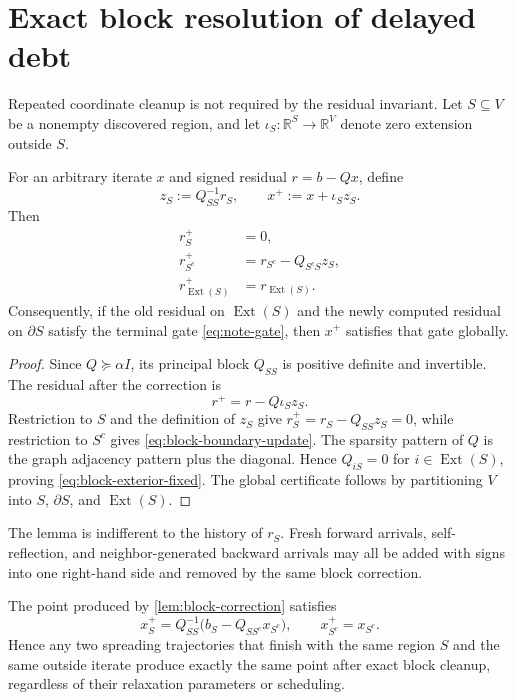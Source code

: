 \section{Exact block resolution of delayed debt}
\label{sec:block-resolution}

Repeated coordinate cleanup is not required by the residual invariant.  Let
$S\subseteq V$ be a nonempty discovered region, and let
$\iota_S:\mathbb R^S\to\mathbb R^V$ denote zero extension outside $S$.

\begin{lemma}
\label{lem:block-correction}
For an arbitrary iterate $x$ and signed residual $r=b-Qx$, define
\begin{equation}
 z_S:=Q_{SS}^{-1}r_S,
 \qquad
 x^+:=x+\iota_S z_S.
 \label{eq:block-correction}
\end{equation}
Then
\begin{align}
 r_S^+&=0,
 \label{eq:block-interior-zero}\\
 r_{S^c}^+&=r_{S^c}-Q_{S^cS}z_S,
 \label{eq:block-boundary-update}\\
 r_{\operatorname{Ext}(S)}^+&=r_{\operatorname{Ext}(S)}.
 \label{eq:block-exterior-fixed}
\end{align}
Consequently, if the old residual on $\operatorname{Ext}(S)$ and the newly
computed residual on $\partial S$ satisfy the terminal gate
\cref{eq:note-gate}, then $x^+$ satisfies that gate globally.
\end{lemma}

\begin{proof}
Since $Q\succeq\alpha I$, its principal block $Q_{SS}$ is positive definite
and invertible.  The residual after the correction is
\[
 r^+=r-Q\iota_Sz_S.
\]
Restriction to $S$ and the definition of $z_S$ give
$r_S^+=r_S-Q_{SS}z_S=0$, while restriction to $S^c$ gives
\cref{eq:block-boundary-update}.  The sparsity pattern of $Q$ is the graph
adjacency pattern plus the diagonal.  Hence $Q_{iS}=0$ for
$i\in\operatorname{Ext}(S)$, proving \cref{eq:block-exterior-fixed}.  The
global certificate follows by partitioning $V$ into
$S$, $\partial S$, and $\operatorname{Ext}(S)$.
\end{proof}

The lemma is indifferent to the history of $r_S$.  Fresh forward arrivals,
self-reflection, and neighbor-generated backward arrivals may all be added
with signs into one right-hand side and removed by the same block correction.

\begin{corollary}
\label{cor:block-history-erasure}
The point produced by \cref{lem:block-correction} satisfies
\begin{equation}
 x_S^+
 =Q_{SS}^{-1}\bigl(b_S-Q_{SS^c}x_{S^c}\bigr),
 \qquad
 x_{S^c}^+=x_{S^c}.
 \label{eq:restricted-dirichlet-point}
\end{equation}
Hence any two spreading trajectories that finish with the same region $S$
and the same outside iterate produce exactly the same point after exact block
cleanup, regardless of their relaxation parameters or scheduling.
\end{corollary}


